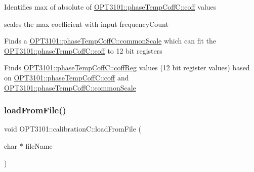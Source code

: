 \begin{DoxyItemize}
\item Identifies max of absolute of \mbox{\hyperlink{class_o_p_t3101_1_1phase_temp_coff_c_ade7d29c7cac1e63af7910eec0ec38043}{O\+P\+T3101\+::phase\+Temp\+Coff\+C\+::coff}} values ~\newline
~\newline
~\newline

\item scales the max coefficient with input frequency\+Count ~\newline
~\newline

\item Finds a \mbox{\hyperlink{class_o_p_t3101_1_1phase_temp_coff_c_a0f7646d71d058bc5354ac8f14270fcf3}{O\+P\+T3101\+::phase\+Temp\+Coff\+C\+::common\+Scale}} which can fit the \mbox{\hyperlink{class_o_p_t3101_1_1phase_temp_coff_c_ade7d29c7cac1e63af7910eec0ec38043}{O\+P\+T3101\+::phase\+Temp\+Coff\+C\+::coff}} to 12 bit registers
\item Finds \mbox{\hyperlink{class_o_p_t3101_1_1phase_temp_coff_c_a69e1782e097ce7ab761e4e55b5206f2e}{O\+P\+T3101\+::phase\+Temp\+Coff\+C\+::coff\+Reg}} values (12 bit register values) based on \mbox{\hyperlink{class_o_p_t3101_1_1phase_temp_coff_c_ade7d29c7cac1e63af7910eec0ec38043}{O\+P\+T3101\+::phase\+Temp\+Coff\+C\+::coff}} and \mbox{\hyperlink{class_o_p_t3101_1_1phase_temp_coff_c_a0f7646d71d058bc5354ac8f14270fcf3}{O\+P\+T3101\+::phase\+Temp\+Coff\+C\+::common\+Scale}} 
\end{DoxyItemize}\mbox{\label{class_o_p_t3101_1_1calibration_c_aa84c53e8568557e5f12819c6736d5b37}} 
\subsubsection{\texorpdfstring{load\+From\+File()}{loadFromFile()}}
{\footnotesize\ttfamily void O\+P\+T3101\+::calibration\+C\+::load\+From\+File (\begin{DoxyParamCaption}\item[{char $\ast$}]{file\+Name }\end{DoxyParamCaption})}



